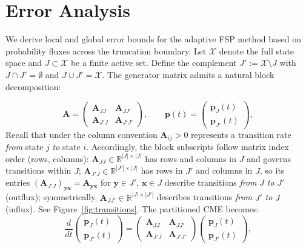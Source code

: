 \documentclass[onefignum,onetabnum]{siamart171218}
\begin{document}
\section{Error Analysis}
\label{sec:theory}

We derive local and global error bounds for the adaptive FSP method based on probability fluxes across the truncation boundary. Let $\mathcal{X}$ denote the full state space and $J \subset \mathcal{X}$ be a finite active set. Define the complement $J' := \mathcal{X} \setminus J$ with $J \cap J' = \emptyset$ and $J \cup J' = \mathcal{X}$. The generator matrix admits a natural block decomposition:

\begin{equation}
\label{eq:block-partition}
\mathbf{A}=
\begin{pmatrix}
\mathbf{A}_{JJ} & \mathbf{A}_{JJ'}\\
\mathbf{A}_{J'J} & \mathbf{A}_{J'J'}
\end{pmatrix}, 
\qquad
\boldsymbol{p}(t)=
\begin{pmatrix}
\boldsymbol{p}_J(t)\\
\boldsymbol{p}_{J'}(t)
\end{pmatrix},
\end{equation}
Recall that under the column convention $\mathbf{A}_{ij} > 0$ represents a transition rate \emph{from} state $j$ \emph{to} state $i$. Accordingly, the block subscripts follow matrix index order (rows, columns): $\mathbf{A}_{JJ} \in \mathbb{R}^{|J| \times |J|}$ has rows and columns in $J$ and governs transitions within $J$; $\mathbf{A}_{J'J} \in \mathbb{R}^{|J'| \times |J|}$ has rows in $J'$ and columns in $J$, so its entries $(\mathbf{A}_{J'J})_{\boldsymbol{y}\boldsymbol{x}} = \mathbf{A}_{\boldsymbol{y}\boldsymbol{x}}$ for $\boldsymbol{y} \in J'$, $\boldsymbol{x} \in J$ describe transitions \emph{from} $J$ \emph{to} $J'$ (outflux); symmetrically, $\mathbf{A}_{JJ'} \in \mathbb{R}^{|J| \times |J'|}$ describes transitions \emph{from} $J'$ \emph{to} $J$ (influx). See Figure~\ref{fig:transitions}. The partitioned CME becomes:
\begin{equation}
\label{eq:partitioned-cme}
\frac{d}{dt}
\begin{pmatrix}
\boldsymbol{p}_J(t) \\
\boldsymbol{p}_{J'}(t)
\end{pmatrix}
=
\begin{pmatrix}
\mathbf{A}_{JJ} & \mathbf{A}_{JJ'}\\
\mathbf{A}_{J'J} & \mathbf{A}_{J'J'}
\end{pmatrix}
\begin{pmatrix}
\boldsymbol{p}_J(t) \\
\boldsymbol{p}_{J'}(t)
\end{pmatrix},
\end{equation}
\end{document}
